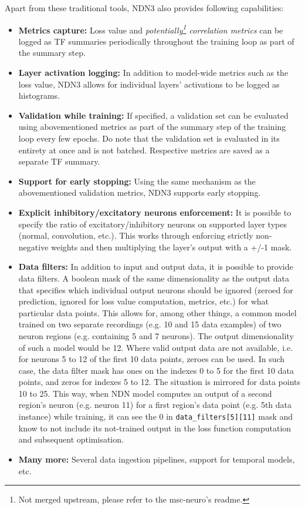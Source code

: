 Apart from these traditional tools, NDN3 also provides following capabilities:

\begin{itemize}
    \item \textbf{Metrics capture:} Loss value and \textit{potentially\footnote{Not merged upstream, please refer to the msc-neuro's readme.} correlation metrics} can be logged as TF summaries periodically throughout the training loop as part of the summary step.
    
    \item \textbf{Layer activation logging:}  In addition to model-wide metrics such as the loss value, NDN3 allows for individual layers’ activations to be logged as histograms.
    
    \item \textbf{Validation while training:} If specified, a validation set can be evaluated using abovementioned metrics as part of the summary step of the training loop every few epochs. Do note that the validation set is evaluated in its entirety at once and is not batched. Respective metrics are saved as a separate TF summary.
    
    \item \textbf{Support for early stopping:} Using the same mechanism as the abovementioned validation metrics, NDN3 supports early stopping.
    
    \item \textbf{Explicit inhibitory/excitatory neurons enforcement:} It is possible to specify the ratio of excitatory/inhibitory neurons on supported layer types (normal, convolution, etc.). This works through enforcing strictly non-negative weights and then multiplying the layer’s output with a +/-1 mask.
    
    \item \textbf{Data filters:} In addition to input and output data, it is possible to provide data filters. A boolean mask of the same dimensionality as the output data that specifies which individual output neurons should be ignored (zeroed for prediction, ignored for loss value computation, metrics, etc.) for what particular data points. This allows for, among other things, a common model trained on two separate recordings (e.g. 10 and 15 data examples) of two neuron regions (e.g. containing 5 and 7 neurons). The output dimensionality of such a model would be 12. Where valid output data are not available, i.e. for neurons 5 to 12 of the first 10 data points, zeroes can be used. In such case, the data filter mask has ones on the indexes 0 to 5 for the first 10 data points, and zeros for indexes 5 to 12. The situation is mirrored for data points 10 to 25. This way, when NDN model computes an output of a second region’s neuron (e.g. neuron 11) for a first region’s data point (e.g. 5th data instance) while training, it can see the 0 in \texttt{data\_filters[5][11]} mask and know to not include its not-trained output in the loss function computation and subsequent optimisation.
    
    \item \textbf{Many more:} Several data ingestion pipelines, support for temporal models, etc.
\end{itemize}

